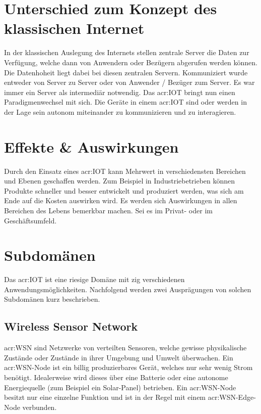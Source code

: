 \section{Unterschied zum Konzept des klassischen Internet}
In der klassischen Auslegung des Internets stellen zentrale Server die Daten zur Verfügung, welche dann von Anwendern oder Bezügern abgerufen werden können. Die Datenhoheit liegt dabei bei diesen zentralen Servern. Kommuniziert wurde entweder von Server zu Server oder von Anwender / Bezüger zum Server. Es war immer ein Server als intermediär notwendig. Das \gls{acr:IOT} bringt nun einen Paradigmenwechsel mit sich. Die Geräte in einem \gls{acr:IOT} sind oder werden in der Lage sein autonom miteinander zu kommunizieren und zu interagieren. 

\section{Effekte \& Auswirkungen}

Durch den Einsatz eines \gls{acr:IOT} kann Mehrwert in verschiedensten Bereichen und Ebenen geschaffen werden. Zum Beispiel in Industriebetrieben können Produkte schneller und besser entwickelt und produziert werden, was sich am Ende auf die Kosten auswirken wird. Es werden sich Auswirkungen in allen Bereichen des Lebens bemerkbar machen. Sei es im Privat- oder im Geschäftsumfeld.


\section{Subdomänen}
Das \gls{acr:IOT} ist eine riesige Domäne mit zig verschiedenen Anwendungsmöglichkeiten. Nachfolgend werden zwei Ausprägungen von solchen Subdomänen kurz beschrieben.


\subsection{Wireless Sensor Network}	
\gls{acr:WSN} sind Netzwerke von verteilten Sensoren, welche gewisse physikalische Zustände oder Zustände in ihrer Umgebung und Umwelt überwachen. Ein \gls{acr:WSN}-Node ist ein billig produzierbares Gerät, welches nur sehr wenig Strom benötigt. Idealerweise wird dieses über eine Batterie oder eine autonome Energiequelle (zum Beispiel ein Solar-Panel) betrieben. Ein \gls{acr:WSN}-Node besitzt nur eine einzelne Funktion und ist in der Regel mit einem \gls{acr:WSN}-Edge-Node verbunden.

